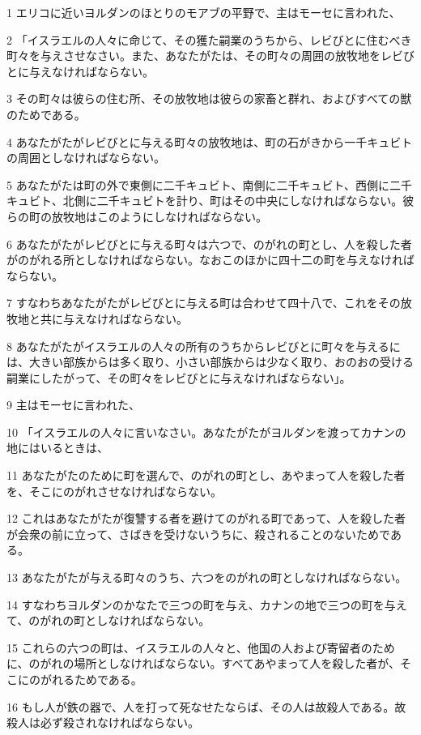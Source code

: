 \par 1 エリコに近いヨルダンのほとりのモアブの平野で、主はモーセに言われた、
\par 2 「イスラエルの人々に命じて、その獲た嗣業のうちから、レビびとに住むべき町々を与えさせなさい。また、あなたがたは、その町々の周囲の放牧地をレビびとに与えなければならない。
\par 3 その町々は彼らの住む所、その放牧地は彼らの家畜と群れ、およびすべての獣のためである。
\par 4 あなたがたがレビびとに与える町々の放牧地は、町の石がきから一千キュビトの周囲としなければならない。
\par 5 あなたがたは町の外で東側に二千キュビト、南側に二千キュビト、西側に二千キュビト、北側に二千キュビトを計り、町はその中央にしなければならない。彼らの町の放牧地はこのようにしなければならない。
\par 6 あなたがたがレビびとに与える町々は六つで、のがれの町とし、人を殺した者がのがれる所としなければならない。なおこのほかに四十二の町を与えなければならない。
\par 7 すなわちあなたがたがレビびとに与える町は合わせて四十八で、これをその放牧地と共に与えなければならない。
\par 8 あなたがたがイスラエルの人々の所有のうちからレビびとに町々を与えるには、大きい部族からは多く取り、小さい部族からは少なく取り、おのおの受ける嗣業にしたがって、その町々をレビびとに与えなければならない」。
\par 9 主はモーセに言われた、
\par 10 「イスラエルの人々に言いなさい。あなたがたがヨルダンを渡ってカナンの地にはいるときは、
\par 11 あなたがたのために町を選んで、のがれの町とし、あやまって人を殺した者を、そこにのがれさせなければならない。
\par 12 これはあなたがたが復讐する者を避けてのがれる町であって、人を殺した者が会衆の前に立って、さばきを受けないうちに、殺されることのないためである。
\par 13 あなたがたが与える町々のうち、六つをのがれの町としなければならない。
\par 14 すなわちヨルダンのかなたで三つの町を与え、カナンの地で三つの町を与えて、のがれの町としなければならない。
\par 15 これらの六つの町は、イスラエルの人々と、他国の人および寄留者のために、のがれの場所としなければならない。すべてあやまって人を殺した者が、そこにのがれるためである。
\par 16 もし人が鉄の器で、人を打って死なせたならば、その人は故殺人である。故殺人は必ず殺されなければならない。
